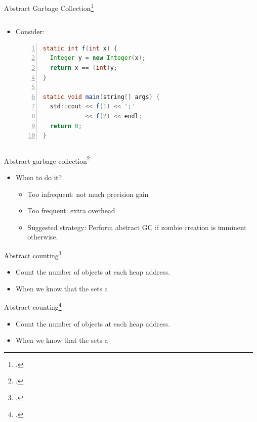 \documentclass[aspectratio=169,14pt]{beamer}
\begin{document}
\begin{frame}[fragile]{Abstract Garbage Collection\footcite{might2006improving}}
  \small
  \begin{columns}
    \begin{column}{.55\textwidth}
        \begin{itemize}
        \item Consider:
          \begin{lstlisting}[language=Java,numbers=left,columns=flexible,basewidth=0.45em]
static int f(int x) {
  Integer y = new Integer(x);
  return x == (int)y;
}

static void main(string[] args) {
  std::cout << f(1) << ';'
            << f(2) << endl;
  return 0;
}
          \end{lstlisting}
        \end{itemize}
    \end{column}
    \begin{column}{.45\textwidth}
    \end{column}
  \end{columns}
\end{frame}

\begin{frame}{Abstract garbage collection\footcite{might2006improving}}
  \begin{itemize}
  \item When to do it?
    \begin{itemize}
    \item Too infrequent: not much precision gain
    \item Too frequent: extra overhead\pause
    \item Suggested strategy: Perform abstract GC if zombie creation is imminent otherwise.
    \end{itemize}
  \end{itemize}
\end{frame}

\begin{frame}{Abstract counting\footcite{might2006improving}}
  \begin{itemize}[<+->]
  \item Count the number of objects at each heap address.
  \item When we know that the sets a
  \end{itemize}
\end{frame}

\begin{frame}{Abstract counting\footcite{might2006improving}}
  \begin{itemize}[<+->]
  \item Count the number of objects at each heap address.
  \item When we know that the sets a
  \end{itemize}
\end{frame}
\end{document}
